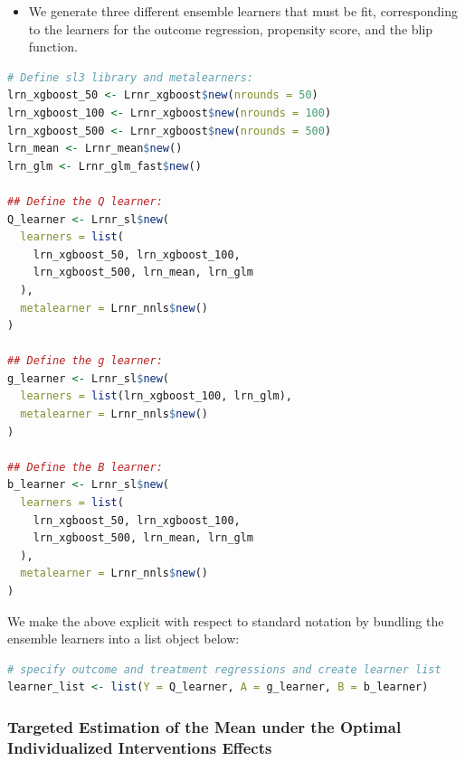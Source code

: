 \documentclass[
  12pt, krantz2,
]{book}
\providecommand{\tightlist}{%
  \setlength{\itemsep}{0pt}\setlength{\parskip}{0pt}}
\theoremstyle{definition}
\theoremstyle{definition}
\theoremstyle{definition}
\newcommand{\1}{\mathbbm{1}}
\begin{document}
\begin{itemize}
\tightlist
\item
  We generate three different ensemble learners that must be fit, corresponding
  to the learners for the outcome regression, propensity score, and the blip
  function.
\end{itemize}

\begin{lstlisting}[language=R]
# Define sl3 library and metalearners:
lrn_xgboost_50 <- Lrnr_xgboost$new(nrounds = 50)
lrn_xgboost_100 <- Lrnr_xgboost$new(nrounds = 100)
lrn_xgboost_500 <- Lrnr_xgboost$new(nrounds = 500)
lrn_mean <- Lrnr_mean$new()
lrn_glm <- Lrnr_glm_fast$new()

## Define the Q learner:
Q_learner <- Lrnr_sl$new(
  learners = list(
    lrn_xgboost_50, lrn_xgboost_100,
    lrn_xgboost_500, lrn_mean, lrn_glm
  ),
  metalearner = Lrnr_nnls$new()
)

## Define the g learner:
g_learner <- Lrnr_sl$new(
  learners = list(lrn_xgboost_100, lrn_glm),
  metalearner = Lrnr_nnls$new()
)

## Define the B learner:
b_learner <- Lrnr_sl$new(
  learners = list(
    lrn_xgboost_50, lrn_xgboost_100,
    lrn_xgboost_500, lrn_mean, lrn_glm
  ),
  metalearner = Lrnr_nnls$new()
)
\end{lstlisting}

We make the above explicit with respect to standard
notation by bundling the ensemble learners into a list object below:

\begin{lstlisting}[language=R]
# specify outcome and treatment regressions and create learner list
learner_list <- list(Y = Q_learner, A = g_learner, B = b_learner)
\end{lstlisting}

\hypertarget{targeted-estimation-of-the-mean-under-the-optimal-individualized-interventions-effects}{%
\subsubsection{Targeted Estimation of the Mean under the Optimal Individualized Interventions Effects}\label{targeted-estimation-of-the-mean-under-the-optimal-individualized-interventions-effects}}
\end{document}
